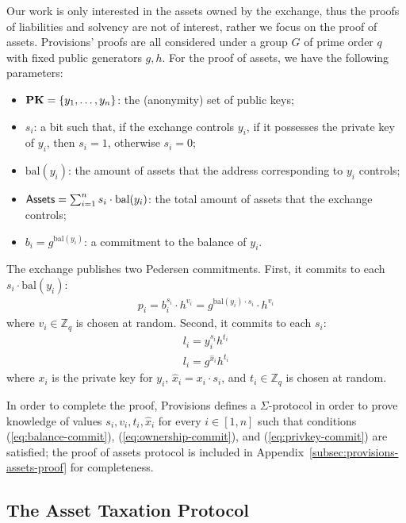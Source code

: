 Our work is only interested in the assets owned by the exchange, thus the
proofs of liabilities and solvency are not of interest, rather we focus on the
proof of assets. Provisions' proofs are all considered under a group $G$ of
prime order $q$ with fixed public generators $g, h$. For the proof of assets,
we have the following parameters:
\begin{itemize}
    \item $\text{\textbf{PK}} = \{y_1, \dots, y_n \}$: the (anonymity) set of public keys;
    \item $s_i$: a bit such that, if the exchange controls $y_i$, \ie if it possesses the private key of $y_i$, then $s_i = 1$, otherwise $s_i = 0$;
    \item $\text{bal}(y_i)$: the amount of assets that the address corresponding to $y_i$ controls;
    \item $\mathsf{Assets} = \sum_{i = 1}^n s_i \cdot \text{bal}(y_i)$: the total amount of assets that the exchange controls;
    \item $b_i = g^{\text{bal}(y_i)}$: a commitment to the balance of $y_i$.
\end{itemize}

The exchange publishes two Pedersen commitments. First, it commits to each $s_i
\cdot \text{bal}(y_i)$:
\begin{align}
    p_i = b_i^{s_i} \cdot h^{v_i} = g^{\text{bal}(y_i) \cdot s_i} \cdot h^{v_i} \label{eq:balance-commit}
\end{align}
where $v_i \in \mathbb{Z}_q$ is chosen at random.
Second, it commits to each $s_i$:
\begin{align}
    l_i = y_i^{s_i}h^{t_i} \label{eq:ownership-commit} \\
    l_i = g^{\hat{x}_i}h^{t_i} \label{eq:privkey-commit}
\end{align}
where $x_i$ is the private key for $y_i$, $\hat{x}_i = x_i \cdot s_i$, and $t_i
\in \mathbb{Z}_q$ is chosen at random.

In order to complete the proof, Provisions defines a $\Sigma$-protocol in order
to prove knowledge of values $s_i, v_i, t_i, \hat{x}_i$ for every $i \in [1,
n]$ such that conditions (\ref{eq:balance-commit}),
(\ref{eq:ownership-commit}), and (\ref{eq:privkey-commit}) are satisfied; the
proof of assets protocol is included in
Appendix~\ref{subsec:provisions-assets-proof} for completeness.

\subsection{The Asset Taxation Protocol}\label{subsec:tax-authority-proto}

